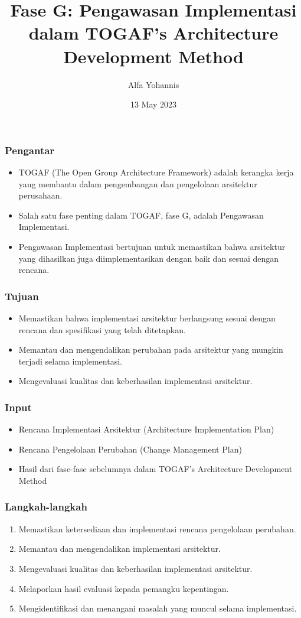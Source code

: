 \documentclass{beamer}
\title{Fase G: Pengawasan Implementasi dalam TOGAF's Architecture Development Method}
\author{Alfa Yohannis}
\date{13 May 2023}
\begin{document}
	
	\frame{\titlepage}
	
	\begin{frame}
		\frametitle{Pengantar}
		\begin{itemize}
			\item TOGAF (The Open Group Architecture Framework) adalah kerangka kerja yang membantu dalam pengembangan dan pengelolaan arsitektur perusahaan.
			\item Salah satu fase penting dalam TOGAF, fase G, adalah Pengawasan Implementasi.
			\item Pengawasan Implementasi bertujuan untuk memastikan bahwa arsitektur yang dihasilkan juga diimplementasikan dengan baik dan sesuai dengan rencana.
		\end{itemize}
	\end{frame}
	
	\begin{frame}
		\frametitle{Tujuan}
		\begin{itemize}
			\item Memastikan bahwa implementasi arsitektur berlangsung sesuai dengan rencana dan spesifikasi yang telah ditetapkan.
			\item Memantau dan mengendalikan perubahan pada arsitektur yang mungkin terjadi selama implementasi.
			\item Mengevaluasi kualitas dan keberhasilan implementasi arsitektur.
		\end{itemize}
	\end{frame}
	
	\begin{frame}
		\frametitle{Input}
		\begin{itemize}
			\item Rencana Implementasi Arsitektur (Architecture Implementation Plan)
			\item Rencana Pengelolaan Perubahan (Change Management Plan)
			\item Hasil dari fase-fase sebelumnya dalam TOGAF's Architecture Development Method
		\end{itemize}
	\end{frame}
	
	\begin{frame}
		\frametitle{Langkah-langkah}
		\begin{enumerate}
			\item Memastikan ketersediaan dan implementasi rencana pengelolaan perubahan.
			\item Memantau dan mengendalikan implementasi arsitektur.
			\item Mengevaluasi kualitas dan keberhasilan implementasi arsitektur.
			\item Melaporkan hasil evaluasi kepada pemangku kepentingan.
			\item Mengidentifikasi dan menangani masalah yang muncul selama implementasi.
		\end{enumerate}
	\end{frame}
	
\end{document}
